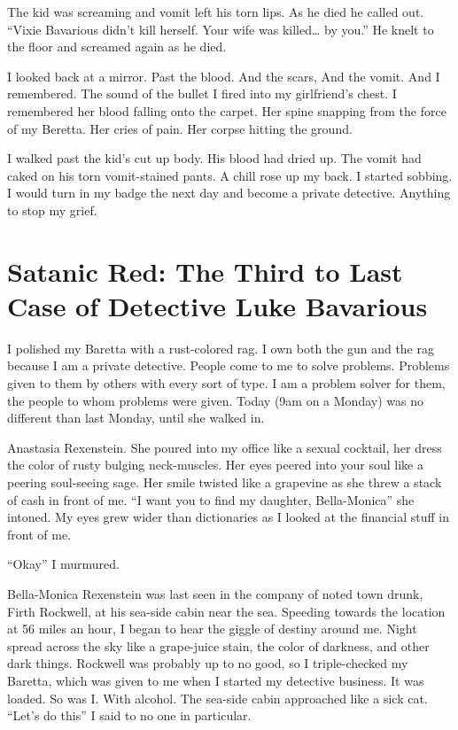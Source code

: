 The kid was screaming and vomit left his torn lips. As he died he
called out. ``Vixie Bavarious didn't kill herself. Your
wife was killed{\ldots} by you.'' He knelt to the floor and
screamed again as he died.

I looked back at a mirror. Past the blood. And the scars, And the
vomit. And I remembered. The sound of the bullet I fired into my
girlfriend's chest. I remembered her blood falling onto the
carpet. Her spine snapping from the force of my Beretta. Her cries
of pain. Her corpse hitting the ground.

I walked past the kid's cut up body. His blood had dried up.
The vomit had caked on his torn vomit-stained pants. A chill rose
up my back. I started sobbing. I would turn in my badge the next
day and become a private detective. Anything to stop my
grief.


 





\chapter[Satanic Red]{Satanic Red: The Third to Last Case of Detective
Luke Bavarious}





I polished my Baretta with a rust-colored rag. I own both the gun
and the rag because I am a private detective. People come to me to
solve problems. Problems given to them by others with every sort of
type. I am a problem solver for them, the people to whom problems
were given. Today (9am on a Monday) was no different than last
Monday, until she walked in.



Anastasia Rexenstein. She poured into my office like a sexual
cocktail, her dress the color of rusty bulging neck-muscles. Her
eyes peered into your soul like a peering soul-seeing sage. Her
smile twisted like a grapevine as she threw a stack of cash in
front of me. ``I want you to find my daughter,
Bella-Monica'' she intoned. My eyes grew wider than
dictionaries as I looked at the financial stuff in front of
me.



``Okay'' I murmured.



Bella-Monica Rexenstein was last seen in the company of noted town
drunk, Firth Rockwell, at his sea-side cabin near the sea. Speeding
towards the location at 56 miles an hour, I began to hear the
giggle of destiny around me. Night spread across the sky like a
grape-juice stain, the color of darkness, and other dark things.
Rockwell was probably up to no good, so I triple-checked my
Baretta, which was given to me when I started my detective
business. It was loaded. So was I. With alcohol. The sea-side cabin
approached like a sick cat. ``Let's do this'' I said to
no one in particular.



